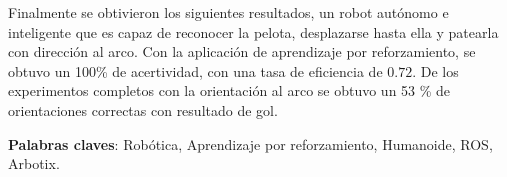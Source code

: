 Finalmente se obtivieron los siguientes resultados, un robot aut\'onomo e inteligente que es capaz de reconocer la pelota, desplazarse hasta ella y patearla con direcci\'on al arco. Con la aplicaci\'on de aprendizaje por reforzamiento, se obtuvo un 100\% de acertividad, con una tasa de eficiencia de $0.72$. De los experimentos completos con la orientaci\'on al arco se obtuvo un 53 \% de orientaciones correctas con resultado de gol.

\textbf{Palabras claves}: Rob\'otica, Aprendizaje por reforzamiento, Humanoide, ROS, Arbotix.


